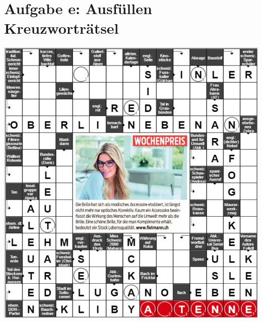 \section*{Aufgabe e: Ausfüllen Kreuzworträtsel}
\includegraphics[width=1.2\textwidth]{images/Kreuzwortraetsel.png}
\newpage